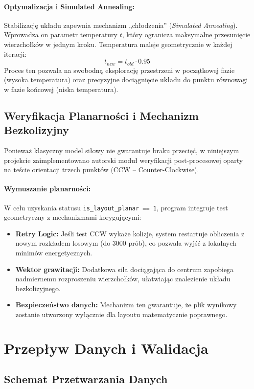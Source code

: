 \documentclass[12pt,a4paper]{article}
\begin{document}
\paragraph{Optymalizacja i Simulated Annealing:}
Stabilizację układu zapewnia mechanizm „chłodzenia” (\textit{Simulated Annealing}). Wprowadza on parametr temperatury $t$, który ogranicza maksymalne przesunięcie wierzchołków w jednym kroku. Temperatura maleje geometrycznie w każdej iteracji:
\[ t_{new} = t_{old} \cdot 0.95 \]
Proces ten pozwala na swobodną eksplorację przestrzeni w początkowej fazie (wysoka temperatura) oraz precyzyjne dociągnięcie układu do punktu równowagi w fazie końcowej (niska temperatura).

\subsection{Weryfikacja Planarności i Mechanizm Bezkolizyjny}
Ponieważ klasyczny model siłowy nie gwarantuje braku przecięć, w niniejszym projekcie zaimplementowano autorski moduł weryfikacji post-procesowej oparty na teście orientacji trzech punktów (CCW – Counter-Clockwise).

\paragraph{Wymuszanie planarności:}
W celu uzyskania statusu \texttt{is\_layout\_planar == 1}, program integruje test geometryczny z mechanizmami korygującymi:
\begin{itemize}
    \item \textbf{Retry Logic:} Jeśli test CCW wykaże kolizje, system restartuje obliczenia z nowym rozkładem losowym (do 3000 prób), co pozwala wyjść z lokalnych minimów energetycznych.
    \item \textbf{Wektor grawitacji:} Dodatkowa siła dociągająca do centrum zapobiega nadmiernemu rozproszeniu wierzchołków, ułatwiając znalezienie układu bezkolizyjnego.
    \item \textbf{Bezpieczeństwo danych:} Mechanizm ten gwarantuje, że plik wynikowy zostanie utworzony wyłącznie dla layoutu matematycznie poprawnego.
\end{itemize}
\newpage
\section{Przepływ Danych i Walidacja}


\subsection{Schemat Przetwarzania Danych}
\end{document}
